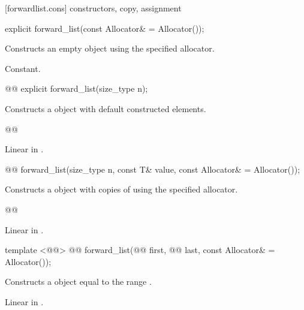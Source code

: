 \documentclass[american,twoside]{book}
\begin{document}
[forwardlist.cons]{ constructors, copy, assignment}

\begin{itemdecl}
explicit forward_list(const Allocator& = Allocator());
\end{itemdecl}

\begin{itemdescr}
\pnum
\effects Constructs an empty  object using the specified allocator.

\pnum
\complexity Constant.
\end{itemdescr}

\begin{itemdecl}
@@ explicit forward_list(size_type n);
\end{itemdecl}

\begin{itemdescr}
\pnum
\effects Constructs a  object with  default constructed elements.

\pnum
@@

\pnum
\complexity Linear in .
\end{itemdescr}

\begin{itemdecl}
@@ 
  forward_list(size_type n, const T& value, const Allocator& = Allocator());
\end{itemdecl}

\begin{itemdescr}
\pnum
\effects Constructs a  object with  copies of  using the specified allocator.

\pnum
@@

\pnum
\complexity Linear in .
\end{itemdescr}

\begin{itemdecl}
template <@@>
  @@
  forward_list(@@ first, @@ last, 
               const Allocator& = Allocator()); 
\end{itemdecl}

\begin{itemdescr}
\pnum
\effects Constructs a  object equal to the range .

\pnum
\complexity Linear in .
\end{itemdescr}
\end{document}
